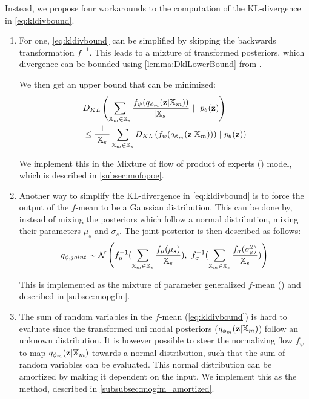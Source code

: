 Instead, we propose four workarounds to the computation of the KL-divergence in \cref{eq:kldivbound}.
\begin{enumerate}

    \item For one, \cref{eq:kldivbound} can be simplified by skipping the backwards transformation $f^{-1}$.
    This leads to a mixture of transformed posteriors, which divergence can be bounded using \cref{lemma:DklLowerBound} from \parencite{sutter_multimodal_2020}.

    We then get an upper bound that can be minimized:
    \begin{equation}
        \begin{split}
            &D_{KL}\left(\sum _{\mathbb{X}_m \in \mathbb{X}_s} \frac{f_{\psi}(q_{\phi_m}(\textbf{z}|\mathbb{X}_m))}{|\mathbb{X}_s|}\ ||\ p_{\theta}(\textbf{z})\right)\\
            &\leq \frac{1}{|\mathbb{X}_s|} \sum  _{\mathbb{X}_m \in \mathbb{X}_s} D_{KL} \left(f_{\psi} (q_{\phi_m}(\textbf{z}|\mathbb{X}_m)))||\ p_{\theta}(\textbf{z}) \right)
        \end{split}
    \end{equation}

    We implement this in the Mixture of flow of product of experts () model, which is described in \cref{subsec:mofopoe}.

    \item Another way to simplify the KL-divergence in \cref{eq:kldivbound} is to force the output of the $f$-mean to be a Gaussian distribution.
    This can be done by, instead of mixing the posteriors which follow a normal distribution, mixing their parameters $\mu_s$ and $\sigma_s$.
    The joint posterior is then described as follows:
    \begin{equation}
        \label{eq:qjointmopgfm}
        q_{\phi, joint} \sim \mathcal{N}\left(  f_{\mu}^{-1}(\sum _{\xsetm \in \xsubset} \frac{f_{\mu}(\mu_s)}{|\xsubset|}),\ f_{\sigma}^{-1}(\sum  _{\xsetm \in \xsubset} \frac{f_{\sigma}(\sigma_s^2)}{|\xsubset|})\right)
    \end{equation}

    This is implemented as the mixture of parameter generalized $f$-mean () and described in \cref{subsec:mopgfm}.

    \item The sum of random variables in the $f$-mean (\cref{eq:kldivbound}) is hard to evaluate since the transformed uni modal posteriors ($q_{\phi_m}(\textbf{z}|\mathbb{X}_m)$) follow an unknown distribution.
    It is however possible to steer the normalizing flow $f_{\psi}$ to map $q_{\phi_m}(\textbf{z}|\mathbb{X}_m)$ towards a normal distribution, such that the sum of random variables can be evaluated.
    This normal distribution can be amortized by making it dependent on the input.
    We implement this as the  method, described in \cref{subsubsec:mogfm_amortized}.


\end{enumerate}
